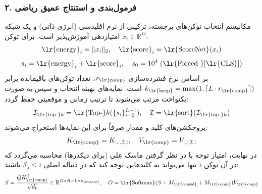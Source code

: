 \subsubsection*{۲. فرمول‌بندی و استنتاج عمیق ریاضی }
مکانیسم انتخاب توکن‌های برجسته، ترکیبی از نرم اقلیدسی (انرژی ذاتی) و یک شبکه امتیازدهی آموزش‌پذیر است. برای توکن $x_i \in \mathbb{R}^D$:
\begin{equation}
\text{\lr{energy}}_i = \|x_i\|_2, \quad \text{\lr{score}}_i = \text{\lr{ScoreNet}}(x_i)
\end{equation}
\begin{equation}
s_i = \text{\lr{energy}}_i + \text{\lr{score}}_i, \quad s_0 = 10^4 \; (\text{\lr{Forced }} [\text{\lr{CLS}}])
\end{equation}
بر اساس نرخ فشرده‌سازی $r_{\text{\lr{comp}}}$، تعداد توکن‌های باقیمانده برابر $k_{\text{\lr{keep}}} = \max(1, \lceil L \cdot r_{\text{\lr{comp}}} \rceil)$ است. نمایه‌های بهینه انتخاب و سپس به صورت یکنواخت مرتب می‌شوند تا ترتیب زمانی و موقعیتی حفظ گردد:
\begin{equation}
\mathcal{I}_{\text{\lr{top-}}k} = \text{\lr{Top-}}k(\{s_i\}_{i=0}^{L-1}), \quad \mathcal{I} = \text{\lr{sort}}(\mathcal{I}_{\text{\lr{top-}}k})
\end{equation}
پروجکشن‌های کلید و مقدار صرفاً برای این نمایه‌ها استخراج می‌شوند:
\begin{equation}
K_{\text{\lr{comp}}} = K_{:, :, \mathcal{I}, :}, \quad V_{\text{\lr{comp}}} = V_{:, :, \mathcal{I}, :}
\end{equation}
در نهایت، امتیاز توجه با در نظر گرفتن ماسک عِلی (برای دیکدرها) محاسبه می‌گردد که در آن توکن $i$ تنها می‌تواند به کلیدهایی توجه کند که در دنباله اصلی $\mathcal{I}_j \le i$ باشند:
\begin{equation}
S = \frac{Q K_{\text{\lr{comp}}}^\top}{\sqrt{d_k}} \in \mathbb{R}^{B \times H \times L \times k_{\text{\lr{keep}}}}, \quad O = \text{\lr{Softmax}}(S + M_{\text{\lr{causal}}} + M_{\text{\lr{comp}}}) V_{\text{\lr{comp}}}
\end{equation}

